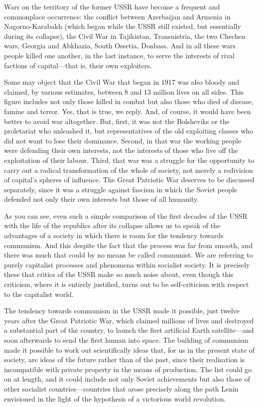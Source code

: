 \documentclass[../main]{subfiles}
\begin{document}
Wars on the territory of the former USSR have become a frequent and commonplace occurrence: the conflict between Azerbaijan and Armenia in Nagorno-Karabakh (which began while the USSR still existed, but essentially during its collapse), the Civil War in Tajikistan, Transnistria, the two Chechen wars, Georgia and Abkhazia, South Ossetia, Donbass. And in all these wars people killed one another, in the last instance, to serve the interests of rival factions of capital—that is, their own exploiters.

Some may object that the Civil War that began in 1917 was also bloody and claimed, by various estimates, between 8 and 13 million lives on all sides. This figure includes not only those killed in combat but also those who died of disease, famine and terror. Yes, that is true, we reply. And, of course, it would have been better to avoid war altogether. But, first, it was not the Bolsheviks or the proletariat who unleashed it, but representatives of the old exploiting classes who did not want to lose their dominance. Second, in that war the working people were defending their own interests, not the interests of those who live off the exploitation of their labour. Third, that war was a struggle for the opportunity to carry out a radical transformation of the whole of society, not merely a redivision of capital’s spheres of influence. The Great Patriotic War deserves to be discussed separately, since it was a struggle against fascism in which the Soviet people defended not only their own interests but those of all humanity.

As you can see, even such a simple comparison of the first decades of the USSR with the life of the republics after its collapse allows us to speak of the advantages of a society in which there is room for the tendency towards communism. And this despite the fact that the process was far from smooth, and there was much that could by no means be called communist. We are referring to purely capitalist processes and phenomena within socialist society. It is precisely these that critics of the USSR make so much noise about, even though this criticism, where it is entirely justified, turns out to be self-criticism with respect to the capitalist world.

The tendency towards communism in the USSR made it possible, just twelve years after the Great Patriotic War, which claimed millions of lives and destroyed a substantial part of the country, to launch the first artificial Earth satellite—and soon afterwards to send the first human into space. The building of communism made it possible to work out scientifically ideas that, for us in the present state of society, are ideas of the future rather than of the past, since their realisation is incompatible with private property in the means of production. The list could go on at length, and it could include not only Soviet achievements but also those of other socialist countries—countries that arose precisely along the path Lenin envisioned in the light of the hypothesis of a victorious world revolution.
\end{document}
